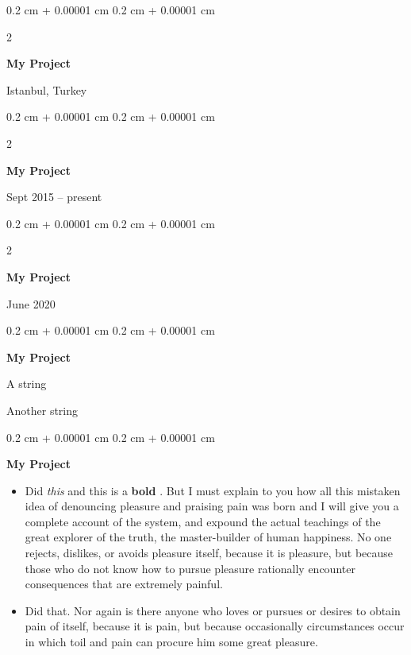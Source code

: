\documentclass[10pt, letterpaper]{article}
\newenvironment{summary}{
    \begin{description}[
        topsep=0.10 cm,
        parsep=0.10 cm,
        partopsep=0pt,
        itemsep=0pt,
        leftmargin=0.4 cm + 10pt
    ]
}{
    \end{description}
} %
\newenvironment{highlights}{
    \begin{itemize}[
        topsep=0.10 cm,
        parsep=0.10 cm,
        partopsep=0pt,
        itemsep=0pt,
        leftmargin=0.4 cm + 10pt
    ]
}{
    \end{itemize}
} %
\newenvironment{onecolentry}{
    \begin{adjustwidth}{
        0.2 cm + 0.00001 cm
    }{
        0.2 cm + 0.00001 cm
    }
}{
    \end{adjustwidth}
} %
\newenvironment{twocolentry}[2][]{
    \onecolentry
    \def\secondColumn{#2}
    \setcolumnwidth{\fill, 4.5 cm}
    \begin{paracol}{2}
}{
    \switchcolumn \raggedleft \secondColumn
    \end{paracol}
    \endonecolentry
} %
\let\hrefWithoutArrow\href
\renewcommand{\href}[2]{\hrefWithoutArrow{#1}{\ifthenelse{\equal{#2}{}}{ }{#2 }\raisebox{.15ex}{\footnotesize \faExternalLink*}}}
\begin{document}
        \begin{twocolentry}{
            Istanbul, Turkey
        }
            \textbf{My Project}
        \end{twocolentry}


        \vspace{0.2 cm}

        \begin{twocolentry}{
            Sept 2015 – present
        }
            \textbf{My Project}
        \end{twocolentry}


        \vspace{0.2 cm}

        \begin{twocolentry}{
            June 2020
        }
            \textbf{My Project}
        \end{twocolentry}


        \vspace{0.2 cm}

        \begin{onecolentry}
            \textbf{My Project}
            \begin{summary}
                \item A string
                \item Another string
            \end{summary}
        \end{onecolentry}


        \vspace{0.2 cm}

        \begin{onecolentry}
            \textbf{My Project}
            \begin{highlights}
                \item Did \textit{this} and this is a \textbf{bold} \href{https://example.com}{link}. But I must explain to you how all this mistaken idea of denouncing pleasure and praising pain was born and I will give you a complete account of the system, and expound the actual teachings of the great explorer of the truth, the master-builder of human happiness. No one rejects, dislikes, or avoids pleasure itself, because it is pleasure, but because those who do not know how to pursue pleasure rationally encounter consequences that are extremely painful.
                \item Did that. Nor again is there anyone who loves or pursues or desires to obtain pain of itself, because it is pain, but because occasionally circumstances occur in which toil and pain can procure him some great pleasure.
            \end{highlights}
        \end{onecolentry}
\end{document}
